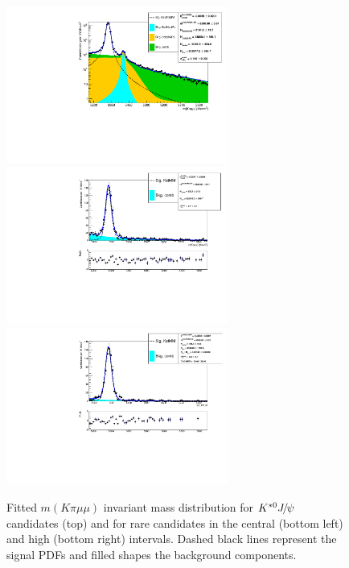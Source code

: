 \begin{figure}[h!]
\centering \includegraphics[width=0.65\textwidth]{RKst/figs/fit_MMs_0_MM-q2central-gmc/KstJPsMM_log.pdf} \\
\includegraphics[width=0.65\textwidth]{RKst/figs/fit_MMs_0_MM-q2central-gmc/KstMM_fitAndRes.pdf}
\includegraphics[width=0.65\textwidth]{RKst/figs/fit_MMs_0_MM-q2high-gmc/KstMM_fitAndRes.pdf}
\caption{Fitted $m(K\pi \mu\mu)$ invariant mass distribution for $\Kstarz\jpsi$ candidates (top)
and for rare candidates in the central (bottom left) and high (bottom right) \qsq intervals.
Dashed black lines represent the signal PDFs and filled shapes the background components. }
\label{fig:mumu_data_fits}
\end{figure}


